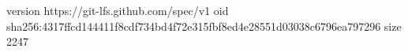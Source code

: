 version https://git-lfs.github.com/spec/v1
oid sha256:4317ffcd144411f8cdf734bd4f72e315fbf8ed4e28551d03038c6796ea797296
size 2247
